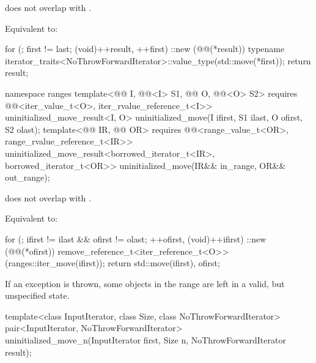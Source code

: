 \begin{itemdescr}
\pnum
\expects
{} does not overlap with .

\pnum
\effects
Equivalent to:
\begin{codeblock}
for (; first != last; (void)++result, ++first)
  ::new (@@(*result))
    typename iterator_traits<NoThrowForwardIterator>::value_type(std::move(*first));
return result;
\end{codeblock}
\end{itemdescr}

%
\begin{itemdecl}
namespace ranges {
  template<@@ I, @@<I> S1,
           @@ O, @@<O> S2>
    requires @@<iter_value_t<O>, iter_rvalue_reference_t<I>>
    uninitialized_move_result<I, O>
      uninitialized_move(I ifirst, S1 ilast, O ofirst, S2 olast);
  template<@@ IR, @@ OR>
    requires @@<range_value_t<OR>, range_rvalue_reference_t<IR>>
    uninitialized_move_result<borrowed_iterator_t<IR>, borrowed_iterator_t<OR>>
      uninitialized_move(IR&& in_range, OR&& out_range);
}
\end{itemdecl}

\begin{itemdescr}
\pnum
\expects
{} does not overlap with .

\pnum
\effects
Equivalent to:
\begin{codeblock}
for (; ifirst != ilast && ofirst != olast; ++ofirst, (void)++ifirst)
  ::new (@@(*ofirst))
    remove_reference_t<iter_reference_t<O>>(ranges::iter_move(ifirst));
return {std::move(ifirst), ofirst};
\end{codeblock}

\pnum
\begin{note}
If an exception is thrown, some objects in the range  are
left in a valid, but unspecified state.
\end{note}
\end{itemdescr}

%
\begin{itemdecl}
template<class InputIterator, class Size, class NoThrowForwardIterator>
  pair<InputIterator, NoThrowForwardIterator>
    uninitialized_move_n(InputIterator first, Size n, NoThrowForwardIterator result);
\end{itemdecl}

